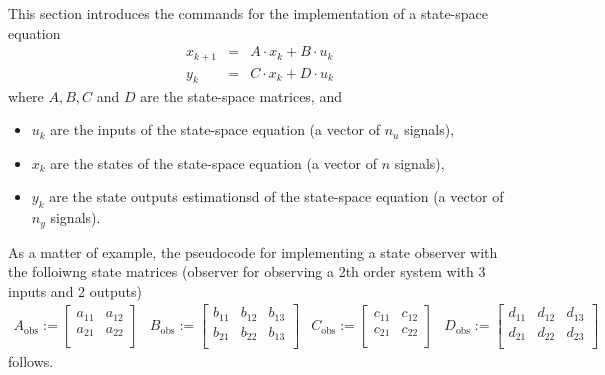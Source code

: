\documentclass[12pt]{Template_}
\begin{document}
This section introduces the commands for the implementation of a state-space equation
\begin{eqnarray*}
 x_{k+1} &=& A\cdot x_k + B\cdot u_k \\
 y_{k} &=& C\cdot x_k + D\cdot u_k
\end{eqnarray*}
where $A, B, C$ and $D$ are the state-space matrices, and
\begin{itemize}
\item $u_k$ are the inputs of the state-space equation (a vector of $n_u$ signals),
\item $x_k$ are the states of the state-space equation (a vector of $n$ signals),
\item $y_k$ are the state outputs estimationsd of the state-space equation (a vector of $n_y$ signals).
\end{itemize}

As a matter of example, the pseudocode for implementing a state observer with the folloiwng state matrices (observer for observing a 2th order system with 3 inputs and 2 outputs)
\[
\begin{array}{cccc}
 A_\mathrm{obs}:=\left[ \begin{array}{cc}
 a_{11} & a_{12}\\
 a_{21} & a_{22}\\
 \end{array}
 \right] &
 B_\mathrm{obs}:=\left[ \begin{array}{ccc}
 b_{11} & b_{12} & b_{13}\\
 b_{21} & b_{22} & b_{13}\\
 \end{array}
 \right] &
 C_\mathrm{obs}:=\left[ \begin{array}{ccc}
 c_{11} & c_{12}\\
 c_{21} & c_{22}\\
 \end{array}
 \right] &
 D_\mathrm{obs}:=\left[ \begin{array}{ccc}
 d_{11} & d_{12} & d_{13}\\
 d_{21} & d_{22} & d_{23}\\
 \end{array}
 \right]
 \end{array}
\]
follows.
\end{document}
